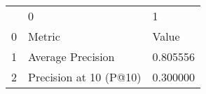 \begin{tabular}{lll}
 & 0 & 1 \\
0 & Metric & Value \\
1 & Average Precision & 0.805556 \\
2 & Precision at 10 (P@10) & 0.300000 \\
\end{tabular}
